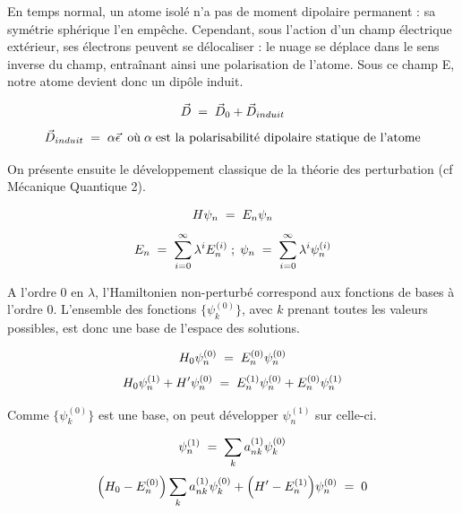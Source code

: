 En temps normal, un atome isolé n'a pas de moment dipolaire permanent : sa symétrie sphérique l'en empêche. Cependant, sous l'action d'un champ électrique extérieur, ses électrons peuvent se délocaliser : le nuage se déplace dans le sens inverse du champ, entraînant ainsi une polarisation de l'atome. Sous ce champ E, notre atome devient donc un dipôle induit.

\begin{equation*}
    \vec{D} \; = \; \vec{D}_0 + \vec{D}_{induit}
\end{equation*}
\begin{equation*}
    \vec{D}_{induit} \; = \; \alpha \vec{\epsilon} \;\; \text{où}\; \alpha \; \text{est la polarisabilité dipolaire statique de l'atome}
\end{equation*}

On présente ensuite le développement classique de la théorie des perturbation (cf Mécanique Quantique 2).

\begin{equation*}
    H\psi_n \; = \; E_n \psi_n
\end{equation*}
\begin{equation*}
    E_n \; = \; \sum_{i=0}^{\infty} \lambda^i E_n^{(i)}\; ; \; \psi_n \; = \; \sum_{i=0}^{\infty} \lambda^i \psi_n^{(i)}
\end{equation*}

A l'ordre 0 en $\lambda$, l'Hamiltonien non-perturbé correspond aux fonctions de bases à l'ordre 0. L'ensemble des fonctions $\{\psi_k^{(0)}\}$, avec $k$ prenant toutes les valeurs possibles, est donc une base de l'espace des solutions.

\begin{equation*}
    H_0 \psi_n^{(0)} \; = \; E_n^{(0)} \psi_n^{(0)}
\end{equation*}
\begin{equation*}
    H_0 \psi_n^{(1)} + H' \psi_n^{(0)} \; = \; E_n^{(1)} \psi_n^{(0)} + E_n^{(0)} \psi_n^{(1)}
\end{equation*}

Comme $\{\psi_k^{(0)}\}$ est une base, on peut développer $\psi_n^{(1)}$ sur celle-ci.

\begin{equation*}
    \psi_n^{(1)} \; = \; \sum_k a_{nk}^{(1)} \psi_k^{(0)}
\end{equation*}
\begin{equation*}
    \Big(H_0 - E^{(0)}_n\Big)\sum_k a_{nk}^{(1)} \psi_k^{(0)} + \Big(H' - E^{(1)}_n\Big)\psi_n^{(0)} \; = \; 0
\end{equation*}


